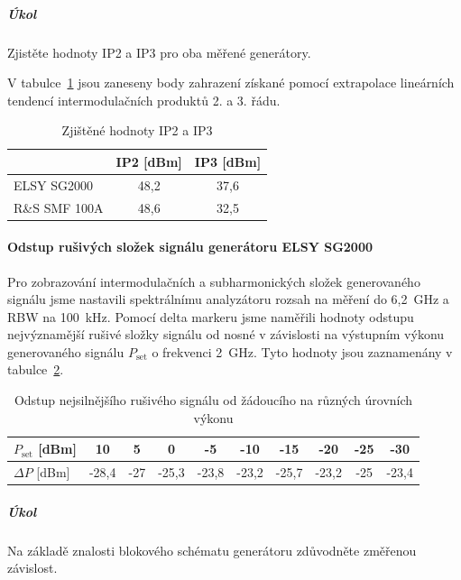\documentclass[11pt,a4paper]{article}
\begin{document}
\subparagraph*{Úkol} Zjistěte hodnoty IP2 a IP3 pro oba měřené generátory.

V tabulce~\ref{table:intercept-points} jsou zaneseny body zahrazení získané pomocí extrapolace lineárních tendencí intermodulačních produktů 2. a 3. řádu.
\begin{table}[!ht]
\begin{center}
\begin{tabular}{| l || c | c |}
    \hline
    & IP2 [dBm] & IP3 [dBm] \\
    \hline\hline
    ELSY SG2000 & 48,2 & 37,6 \\
    \hline
    R\&S SMF 100A & 48,6 & 32,5 \\
    \hline
\end{tabular}
\caption{Zjištěné hodnoty IP2 a IP3}
\label{table:intercept-points}
\end{center}
\end{table}

\paragraph*{Odstup rušivých složek signálu generátoru ELSY SG2000}
Pro zobrazování intermodulačních a subharmonických složek generovaného signálu jsme nastavili spektrálnímu analyzátoru rozsah na měření do 6,2~GHz a RBW na 100~kHz. Pomocí delta markeru jsme naměřili hodnoty odstupu nejvýznamější rušivé složky signálu od nosné v závislosti na výstupním výkonu generovaného signálu $P_{\mathrm{set}}$ o frekvenci 2~GHz. Tyto hodnoty jsou zaznamenány v tabulce~\ref{table:spurious-signal-distance-ELSY}.

\begin{table}[!ht]
\begin{center}
\begin{tabular}{| l || c | c | c | c | c | c | c | c | c |}
    \hline
    $P_{\mathrm{set}}$ [dBm] & 10 & 5 & 0 & -5 & -10 & -15 & -20 & -25 & -30 \\
    \hline
    $\Delta P$ [dBm] & -28,4 & -27 & -25,3 & -23,8 & -23,2 & -25,7 & -23,2 & -25 & -23,4 \\
    \hline
\end{tabular}
\caption{Odstup nejsilnějšího rušivého signálu od žádoucího na různých úrovních výkonu}
\label{table:spurious-signal-distance-ELSY}
\end{center}
\end{table}

\subparagraph*{Úkol} Na základě znalosti blokového schématu generátoru zdůvodněte změřenou závislost.
\end{document}
